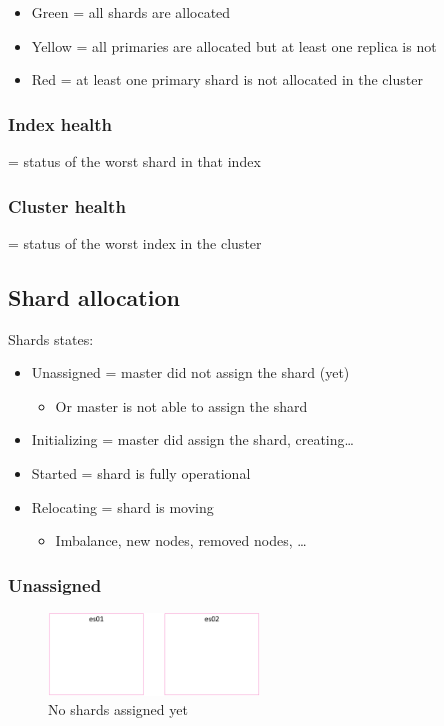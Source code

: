 \documentclass{article}
\begin{document}
\begin{itemize}
    \item Green = all shards are allocated
    \item Yellow = all primaries are allocated but at least one replica is not
    \item Red = at least one primary shard is not allocated in the cluster
\end{itemize}

\subsubsection{Index health}

= status of the worst shard in that index

\subsubsection{Cluster health}

= status of the worst index in the cluster

\subsection{Shard allocation}

Shards states:

\begin{itemize}
    \item Unassigned = master did not assign the shard (yet)
    \begin{itemize}
        \item Or master is not able to assign the shard
    \end{itemize}
    \item Initializing = master did assign the shard, creating\dots
    \item Started = shard is fully operational
    \item Relocating = shard is moving
    \begin{itemize}
        \item Imbalance, new nodes, removed nodes, \dots
    \end{itemize}
\end{itemize}

\subsubsection{Unassigned}

\begin{figure}[H]
    \centering
    \includegraphics[width=0.5\textwidth]{shard-alloc-unassigned.png}
    \caption{No shards assigned yet}
\end{figure}
\end{document}
